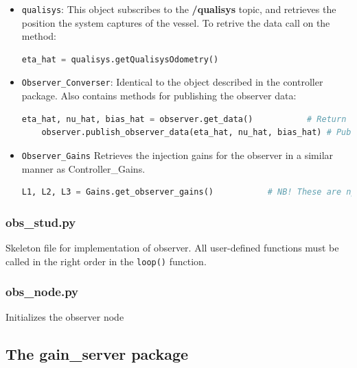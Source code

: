 \begin{itemize}
    \item \lstinline{qualisys}: This object subscribes to the \textbf{/qualisys} topic, and retrieves the position the system captures of the vessel. To retrive the data call on the method: 
    
    \begin{lstlisting}[language=python,basicstyle=\mlttfamily, breaklines=true]
    eta_hat = qualisys.getQualisysOdometry()
    \end{lstlisting}
    
    \item \lstinline{Observer_Converser}: Identical to the object described in the controller package. Also contains methods for publishing the observer data: 
     \begin{lstlisting}[language=python,basicstyle=\mlttfamily, breaklines=true]
    eta_hat, nu_hat, bias_hat = observer.get_data()           # Return newest estimate
    observer.publish_observer_data(eta_hat, nu_hat, bias_hat) # Publish computed estimate
    \end{lstlisting}
    
    \item \lstinline{Observer_Gains}
    Retrieves the injection gains for the observer in a similar manner as Controller\_Gains. 
    \begin{lstlisting}[language=python,basicstyle=\mlttfamily, breaklines=true]
    L1, L2, L3 = Gains.get_observer_gains()           # NB! These are np.arrays with n=3 
    \end{lstlisting}
\end{itemize}

\subsubsection{obs\_stud.py}
Skeleton file for implementation of observer. All user-defined functions must be called in the right order in the \lstinline{loop()} function. 

\subsubsection{obs\_node.py}
Initializes the observer node

\subsection{The gain\_server package}

